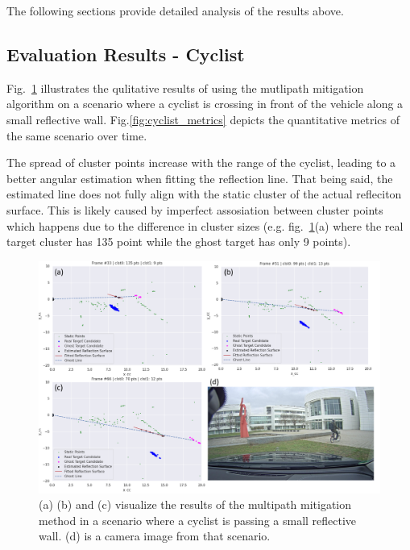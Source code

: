 \documentclass[../main.tex]{subfiles}
\begin{document}
\par
The following sections provide detailed analysis of the results above.


\subsection{Evaluation Results - Cyclist}
Fig.~\ref{fig:cyclist} illustrates the qulitative results of using the mutlipath mitigation algorithm on a scenario where a cyclist is crossing in front of the vehicle along a small reflective wall. Fig.\ref*{fig:cyclist_metrics} depicts the quantitative metrics of the same scenario over time. \\

\par
The spread of cluster points increase with the range of the cyclist, leading to a better angular estimation when fitting the reflection line. That being said, the estimated line does not fully align with the static cluster of the actual refleciton surface. This is likely caused by imperfect assosiation between cluster points which happens due to the difference in cluster sizes (e.g. fig.~\ref{fig:cyclist}(a) where the real target cluster has 135 point while the ghost target has only 9 points).

\begin{figure}[htbp]
    \centerline{\includegraphics[scale=0.3]{figures/fig_cyclist.png}}
    \caption{(a) (b) and (c) visualize the results of the multipath mitigation method in a scenario where a cyclist is passing a small reflective wall. (d) is a camera image from that scenario.}
    \label{fig:cyclist}
\end{figure}
\end{document}
